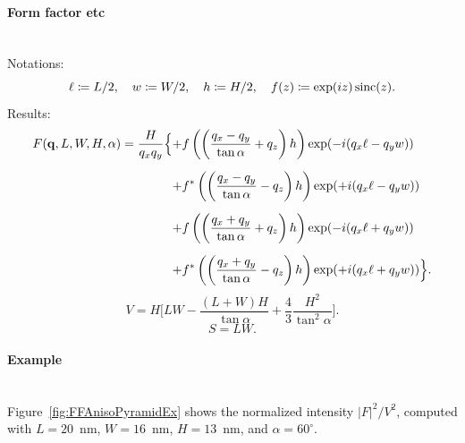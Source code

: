 \paragraph{Form factor etc}\strut\\
Notations:
\begin{displaymath}
  \ell\coloneqq L/2,\quad
  w\coloneqq W/2,\quad
  h\coloneqq H/2,\quad
  f(z)\coloneqq \exp(i z)\operatorname{sinc}(z).
\end{displaymath}
Results:
\begin{equation*}
\begin{array}{@{}l@{}l@{}}
\DS F(\mathbf{q}, L, W, H, \alpha)=
\frac{H}{q_xq_y} \Big\{
   &+\DS  f\left(\left(\frac{q_x-q_y}{\tan\alpha} +q_z\right)h\right)
        \exp(-i(q_x\ell-q_y w))
\\[3.6ex]
   &\DS+ f^*\left(\left(\frac{q_x-q_y}{\tan\alpha} -q_z\right)h\right)
        \exp(+i(q_x\ell-q_y w))
\\[3.6ex]
   &\DS+ f\left(\left(\frac{q_x+q_y}{\tan\alpha} +q_z\right)h\right)
        \exp(-i(q_x\ell+q_y w))
\\[3.6ex]
   &\DS+ f^*\left(\left(\frac{q_x+q_y}{\tan\alpha} -q_z\right)h\right)
        \exp(+i(q_x\ell+q_y w))
\Big\}.
\end{array}
\end{equation*}
\begin{equation*}
  V= H \Big[LW - \dfrac{(L + W)H}{\tan\alpha} + \dfrac{4}{3} \dfrac{H^2}{\tan^2\alpha}\Big].
\end{equation*}
\begin{equation*}
  S=LW.
\end{equation*}

\paragraph{Example}\strut\\
Figure~\ref{fig:FFAnisoPyramidEx} shows the normalized intensity
$|F|^2/V^2$, computed with $L=20$~nm, $W=16$~nm, $H=13$~nm, and
$\alpha=60^{\circ}$.

